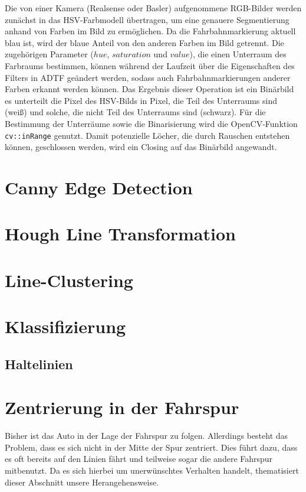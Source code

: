 \documentclass[a4paper,12pt]{report}
\begin{document}
	Die von einer Kamera (Realsense oder Basler) aufgenommene RGB-Bilder werden zunächst in das HSV-Farbmodell übertragen, um eine genauere Segmentierung anhand von Farben im Bild zu ermöglichen.
	Da die Fahrbahnmarkierung aktuell blau ist, wird der blaue Anteil von den anderen Farben im Bild getrennt. Die zugehörigen Parameter ($hue$, $saturation$ und $value$), die einen Unterraum des Farbraums bestimmen, können während der Laufzeit über die Eigenschaften des Filters in ADTF geändert werden, sodass auch Fahrbahnmarkierungen anderer Farben erkannt werden können.
	Das Ergebnis dieser Operation ist ein Binärbild es unterteilt die Pixel des HSV-Bilds in Pixel, die Teil des Unterraums sind (weiß) und solche, die nicht Teil des Unterraums sind (schwarz). Für die Bestimmung der Unterräume sowie die Binarisierung wird die OpenCV-Funktion \texttt{cv::inRange} genutzt.
	Damit potenzielle Löcher, die durch Rauschen entstehen können, geschlossen werden, wird ein Closing auf das Binärbild angewandt.

\section{Canny Edge Detection} %

\section{Hough Line Transformation}

\section{Line-Clustering}

\section{Klassifizierung}

\subsection{Haltelinien}

\section{Zentrierung in der Fahrspur}
	
	Bisher ist das Auto in der Lage der Fahrspur zu folgen.
	Allerdings besteht das Problem, dass es sich nicht in der Mitte der Spur zentriert.
	Dies führt dazu, dass es oft bereits auf den Linien fährt und teilweise sogar die andere Fahrspur mitbenutzt.
	Da es sich hierbei um unerwünschtes Verhalten handelt, thematisiert dieser Abschnitt unsere Herangehensweise.
\end{document}
